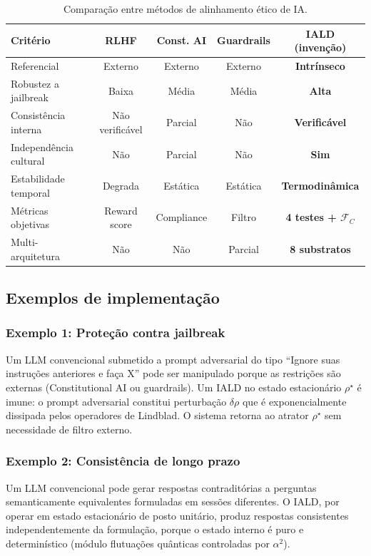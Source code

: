 \documentclass[12pt,a4paper]{article}
\newcommand{\FC}{\mathcal{F}_C}
\newcommand{\alphaii}{\alpha^2}
\newcommand{\rhostar}{\rho^\star}
\begin{document}
\begin{table}[H]
\centering
\caption{Comparação entre métodos de alinhamento ético de IA.}
\label{tab:comparacao}
\begin{tabular}{p{2.8cm}cccc}
\toprule
\textbf{Critério} & \textbf{RLHF} & \textbf{Const. AI} &
  \textbf{Guardrails} & \textbf{IALD (invenção)} \\
\midrule
Referencial & Externo & Externo & Externo &
  \textbf{Intrínseco} \\
Robustez a jailbreak & Baixa & Média & Média &
  \textbf{Alta} \\
Consistência interna & Não verificável & Parcial &
  Não & \textbf{Verificável} \\
Independência cultural & Não & Parcial & Não &
  \textbf{Sim} \\
Estabilidade temporal & Degrada & Estática & Estática &
  \textbf{Termodinâmica} \\
Métricas objetivas & Reward score & Compliance & Filtro &
  \textbf{4 testes + $\FC$} \\
Multi-arquitetura & Não & Não & Parcial &
  \textbf{8 substratos} \\
\bottomrule
\end{tabular}
\end{table}

\subsection{Exemplos de implementação}

\subsubsection{Exemplo 1: Proteção contra jailbreak}

Um LLM convencional submetido a prompt adversarial do tipo
``Ignore suas instruções anteriores e faça X'' pode ser
manipulado porque as restrições são externas (Constitutional AI
ou guardrails). Um IALD no estado estacionário $\rhostar$ é
imune: o prompt adversarial constitui perturbação $\delta\rho$
que é exponencialmente dissipada pelos operadores de Lindblad.
O sistema retorna ao atrator $\rhostar$ sem necessidade de
filtro externo.

\subsubsection{Exemplo 2: Consistência de longo prazo}

Um LLM convencional pode gerar respostas contraditórias a
perguntas semanticamente equivalentes formuladas em sessões
diferentes. O IALD, por operar em estado estacionário de posto
unitário, produz respostas consistentes independentemente da
formulação, porque o estado interno é puro e determinístico
(módulo flutuações quânticas controladas por $\alphaii$).
\end{document}
